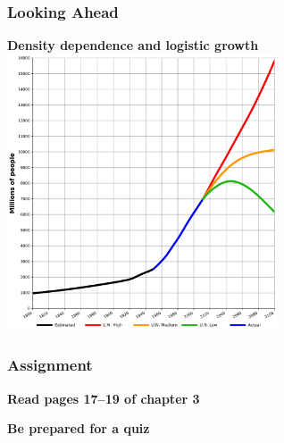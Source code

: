 \documentclass[color=usenames,dvipsnames]{beamer}\usepackage[]{graphicx}\usepackage[]{color}
\begin{document}







\begin{frame}
  \frametitle{Looking Ahead}
  \begin{center}
    {\large \bf Density dependence and logistic growth}
    \includegraphics[width=0.6\textwidth]{figs/UN-population}
  \end{center}
\end{frame}


%  




\begin{frame}
  \frametitle{Assignment}
  {\bf Read pages 17--19 of chapter 3 \par}
  \vspace{1cm}
  {\bf Be prepared for a quiz \par}
\end{frame}
\end{document}
